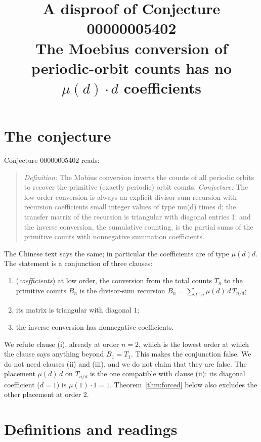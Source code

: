 \documentclass[11pt]{article}
\title{A disproof of Conjecture 00000005402\\[2pt]
\large The Moebius conversion of periodic-orbit counts has no $\mu(d)\cdot d$ coefficients}
\date{}
\theoremstyle{definition}
\theoremstyle{remark}
\renewcommand{\_}{\oldus\allowbreak}
\begin{document}
\sloppy
\maketitle

\section{The conjecture}

Conjecture 00000005402 reads:

\begin{quote}
\emph{Definition:} The Mobius conversion inverts the counts of all periodic orbits to recover the primitive
(exactly periodic) orbit counts. \emph{Conjecture:} The low-order conversion is always an explicit
divisor-sum recursion with recursion coefficients small integer values of type mu(d) times d; the transfer
matrix of the recursion is triangular with diagonal entries 1; and the inverse conversion, the cumulative
counting, is the partial sums of the primitive counts with nonnegative summation coefficients.
\end{quote}

The Chinese text says the same; in particular the coefficients are of type $\mu(d)d$.
The statement is a conjunction of three clauses:
\begin{enumerate}[label=(\roman*)]
  \item (\emph{coefficients}) at low order, the conversion from the total counts $T_n$ to the primitive counts
        $B_n$ is the divisor-sum recursion $B_n=\sum_{d\mid n}\mu(d)\,d\,T_{n/d}$;
  \item its matrix is triangular with diagonal $1$;
  \item the inverse conversion has nonnegative coefficients.
\end{enumerate}
We refute clause (i), already at order $n=2$, which is the lowest order at which the clause says anything
beyond $B_1=T_1$. This makes the conjunction false. We do not need clauses (ii) and (iii), and we do not
claim that they are false.
The placement $\mu(d)\,d$ on $T_{n/d}$ is the one compatible with clause (ii): its diagonal coefficient
($d=1$) is $\mu(1)\cdot 1=1$. Theorem~\ref{thm:forced} below also excludes the other placement at order $2$.

\section{Definitions and readings}
\end{document}
